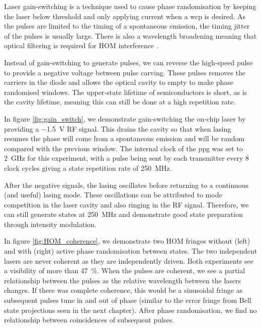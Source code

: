 
Laser gain-switching is a technique used to cause phase randomisation by keeping the laser below threshold and only applying current when a \ac{wcp} is desired. As the pulses are limited to the timing of a spontaneous emission, the timing jitter of the pulses is usually large. There is also a wavelength broadening meaning that optical filtering is required for \ac{HOM} interference \cite{Agnesi2019}. 

Instead of gain-switching to generate pulses, we can reverse the high-speed pulse to provide a negative voltage between pulse carving. These pulses removes the carriers in the diode and allows the optical cavity to empty to make phase randomised windows. The upper-state lifetime of semiconductors is short, as is the cavity lifetime, meaning this can still be done at a high repetition rate. 

\begin{parahigh}
In figure \ref{fig:gain_switch}, we demonstrate gain-switching the on-chip laser by providing a \SI{-1.5}{V} RF signal. This drains the cavity so that when lasing resumes the phase will come from a spontaneous emission and will be random compared with the previous window. The internal clock of the \ac{ppg} was set to \SI{2}{GHz} for this experiment, with a pulse being sent by each transmitter every 8 clock cycles giving a state repetition rate of \SI{250}{MHz}. 
\end{parahigh}

After the negative signals, the lasing oscillates before returning to a continuous (and useful) lasing mode. These oscillations can be attributed to mode competition in the laser cavity and also ringing in the RF signal. Therefore, we can still generate states at \SI{250}{MHz} and demonstrate good state preparation through intensity modulation.

\begin{parahigh}
In figure \ref{fig:HOM_coherence}, we demonstrate two \ac{HOM} fringes without (left) and with (right) active phase randomisation between states. The two independent lasers are never coherent as they are independently driven. Both experiments see a visibility of more than \SI{47}{\percent}. When the pulses are coherent, we see a partial relationship between the pulses as the relative wavelength between the lasers changes. If there was complete coherence, this would be a sinusoidal fringe as subsequent pulses tune in and out of phase (similar to the error fringe from Bell state projections seen in the next chapter). After phase randomisation, we find no relationship between coincidences of subsequent pulses.
\end{parahigh}

